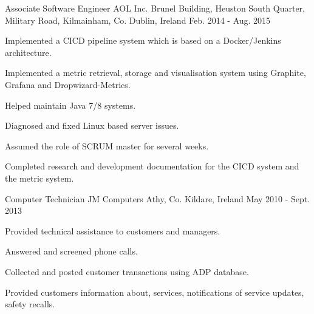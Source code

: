\begin{cventries}
  \cventry
    {Associate Software Engineer}
    {AOL Inc.}
    {Brunel Building, Heuston South Quarter, Military Road, Kilmainham, Co. Dublin, Ireland}
    {Feb. 2014 - Aug. 2015}
    {
      \begin{cvitems}
        \item {Implemented a CICD pipeline system which is based on a Docker/Jenkins architecture.}
        \item {Implemented a metric retrieval, storage and visualisation system using Graphite, Grafana and Dropwizard-Metrics.}
        \item {Helped maintain Java 7/8 systems.}
        \item {Diagnosed and fixed Linux based server issues.}
        \item {Assumed the role of SCRUM master for several weeks.}
        \item {Completed research and development documentation for the CICD system and the metric system.}
      \end{cvitems}
    }
   
  \cventry
    {Computer Technician}
    {JM Computers}
    {Athy, Co. Kildare, Ireland}
    {May 2010 - Sept. 2013}
    {
      \begin{cvitems}
        \item {Provided technical assistance to customers and managers.}
        \item {Answered and screened phone calls.}
        \item {Collected and posted customer transactions using ADP database.}
        \item {Provided customers information about, services, notifications of service updates, safety recalls.}
      \end{cvitems}
    }
\end{cventries}
